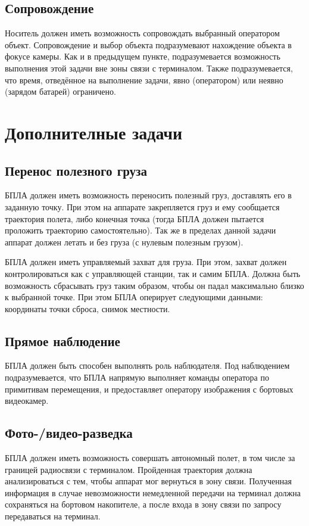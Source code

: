 \documentclass[utf8]{report}
\begin{document}
\subsection{Сопровождение}

Носитель должен иметь возможность сопровождать выбранный оператором объект. Сопровождение и выбор объекта подразумевают нахождение объекта в фокусе камеры. Как и в предыдущем пункте, подразумевается возможность выполнения этой задачи вне зоны связи с терминалом. Также подразумевается, что время, отведённое на выполнение задачи, явно (оператором) или неявно (зарядом батарей) ограничено.

\section{Дополнителные задачи}

\subsection{Перенос полезного груза}
БПЛА должен иметь возможность переносить полезный груз, доставлять его в заданную точку. При этом на аппарате закрепляется груз и ему сообщается траектория полета, либо конечная точка (тогда БПЛА должен пытается проложить траекторию самостоятельно).
Так же в пределах данной задачи аппарат должен летать и без груза (с нулевым полезным грузом).

БПЛА должен иметь управляемый захват для груза. При этом, захват должен контролироваться как с управляющей станции, так и самим БПЛА. 
Должна быть возможность сбрасывать груз таким образом, чтобы он падал максимально близко к выбранной точке. При этом БПЛА оперирует следующими данными: координаты точки сброса, снимок местности.

\subsection{Прямое наблюдение}
БПЛА должен быть способен выполнять роль наблюдателя. Под наблюдением подразумевается, что БПЛА напрямую выполняет команды оператора по примитивам перемещения, и предоставляет оператору изображения с бортовых видеокамер.

\subsection{Фото-/видео-разведка}
БПЛА должен иметь возможность совершать автономный полет, в том числе за границей радиосвязи с терминалом. Пройденная траектория должна анализироваться с тем, чтобы аппарат мог вернуться в зону связи. Полученная информация в случае невозможности немедленной передачи на терминал должна сохраняться на бортовом накопителе, а после входа в зону связи по запросу передаваться на терминал.
\end{document}
